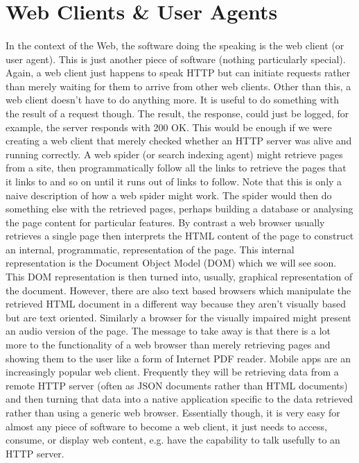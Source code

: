 \documentclass[12pt, a4paper, oneside]{book}
\begin{document}
\section{Web Clients \& User Agents}
\paragraph{} In the context of the Web, the software doing the speaking is the web client (or user agent). This is just another piece of software (nothing particularly special). Again, a web client just happens to speak HTTP but can initiate requests rather than merely waiting for them to arrive from other web clients. Other than this, a web client doesn't have to do anything more. It is useful to do something with the result of a request though. The result, the response, could just be logged, for example, the server responds with 200 OK. This would be enough if we were creating a web client that merely checked whether an HTTP server was alive and running correctly. A web spider (or search indexing agent) might retrieve pages from a site, then programmatically follow all the links to retrieve the pages that it links to and so on until it runs out of links to follow. Note that this is only a naive description of how a web spider might work. The spider would then do something else with the retrieved pages, perhaps building a database or analysing the page content for particular features. By contrast a web browser usually retrieves a single page then interprets the HTML content of the page to construct an internal, programmatic, representation of the page. This internal representation is the Document Object Model (DOM) which we will see soon. This DOM representation is then turned into, usually, graphical representation of the document. However, there are also text based browsers which manipulate the retrieved HTML document in a different way because they aren't visually based but are text oriented. Similarly a browser for the visually impaired might present an audio version of the page. The message to take away is that there is a lot more to the functionality of a web browser than merely retrieving pages and showing them to the user like a form of Internet PDF reader. Mobile apps are an increasingly popular web client. Frequently they will be retrieving data from a remote HTTP server (often as JSON documents rather than HTML documents) and then turning that data into a native application specific to the data retrieved rather than using a generic web browser. Essentially though, it is very easy for almost any piece of software to become a web client, it just needs to access, consume, or display web content, e.g. have the capability to talk usefully to an HTTP server.
\end{document}
